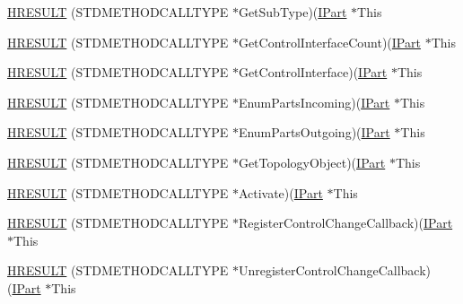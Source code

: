 \begin{DoxyCompactItemize}
\item 
\hyperlink{struct_i_part_vtbl_abdd3e2e7be126b6200f28f610a2feb62}{H\+R\+E\+S\+U\+LT} (S\+T\+D\+M\+E\+T\+H\+O\+D\+C\+A\+L\+L\+T\+Y\+PE $\ast$Get\+Sub\+Type)(\hyperlink{devicetopology_8h_adabb5bd8e19759521e1498eef1d0b56f}{I\+Part} $\ast$This
\item 
\hyperlink{struct_i_part_vtbl_ac95a9464ebf160cea18aff4c0a3f64ed}{H\+R\+E\+S\+U\+LT} (S\+T\+D\+M\+E\+T\+H\+O\+D\+C\+A\+L\+L\+T\+Y\+PE $\ast$Get\+Control\+Interface\+Count)(\hyperlink{devicetopology_8h_adabb5bd8e19759521e1498eef1d0b56f}{I\+Part} $\ast$This
\item 
\hyperlink{struct_i_part_vtbl_a8e7e97a2b90d584ebefdecc72a37fd59}{H\+R\+E\+S\+U\+LT} (S\+T\+D\+M\+E\+T\+H\+O\+D\+C\+A\+L\+L\+T\+Y\+PE $\ast$Get\+Control\+Interface)(\hyperlink{devicetopology_8h_adabb5bd8e19759521e1498eef1d0b56f}{I\+Part} $\ast$This
\item 
\hyperlink{struct_i_part_vtbl_a6746c54daef96a3a5d2c7da5887bd197}{H\+R\+E\+S\+U\+LT} (S\+T\+D\+M\+E\+T\+H\+O\+D\+C\+A\+L\+L\+T\+Y\+PE $\ast$Enum\+Parts\+Incoming)(\hyperlink{devicetopology_8h_adabb5bd8e19759521e1498eef1d0b56f}{I\+Part} $\ast$This
\item 
\hyperlink{struct_i_part_vtbl_a72ec65f8ac0b586a17fc6e789c0ec95d}{H\+R\+E\+S\+U\+LT} (S\+T\+D\+M\+E\+T\+H\+O\+D\+C\+A\+L\+L\+T\+Y\+PE $\ast$Enum\+Parts\+Outgoing)(\hyperlink{devicetopology_8h_adabb5bd8e19759521e1498eef1d0b56f}{I\+Part} $\ast$This
\item 
\hyperlink{struct_i_part_vtbl_a87dfeff3d3694a3a1848023ffa93bb41}{H\+R\+E\+S\+U\+LT} (S\+T\+D\+M\+E\+T\+H\+O\+D\+C\+A\+L\+L\+T\+Y\+PE $\ast$Get\+Topology\+Object)(\hyperlink{devicetopology_8h_adabb5bd8e19759521e1498eef1d0b56f}{I\+Part} $\ast$This
\item 
\hyperlink{struct_i_part_vtbl_af7a12f06de81fcb87e5d683dc40e06d9}{H\+R\+E\+S\+U\+LT} (S\+T\+D\+M\+E\+T\+H\+O\+D\+C\+A\+L\+L\+T\+Y\+PE $\ast$Activate)(\hyperlink{devicetopology_8h_adabb5bd8e19759521e1498eef1d0b56f}{I\+Part} $\ast$This
\item 
\hyperlink{struct_i_part_vtbl_a4a6851fb7207633869e03c90d38c5ad7}{H\+R\+E\+S\+U\+LT} (S\+T\+D\+M\+E\+T\+H\+O\+D\+C\+A\+L\+L\+T\+Y\+PE $\ast$Register\+Control\+Change\+Callback)(\hyperlink{devicetopology_8h_adabb5bd8e19759521e1498eef1d0b56f}{I\+Part} $\ast$This
\item 
\hyperlink{struct_i_part_vtbl_a93694fbb28f944c28934a62487c4a6ac}{H\+R\+E\+S\+U\+LT} (S\+T\+D\+M\+E\+T\+H\+O\+D\+C\+A\+L\+L\+T\+Y\+PE $\ast$Unregister\+Control\+Change\+Callback)(\hyperlink{devicetopology_8h_adabb5bd8e19759521e1498eef1d0b56f}{I\+Part} $\ast$This
\end{DoxyCompactItemize}
